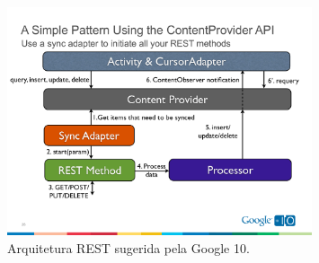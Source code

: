 \documentclass[12pt,a4paper,oneside]{report}
\begin{document}
\begin{figure}[h!]
   \centering
    \includegraphics[width=0.8\textwidth]{figuras/rest_android}
    \caption{Arquitetura REST sugerida pela Google 10.}
    \label{fig:rest_android}
\end{figure}
\end{document}
